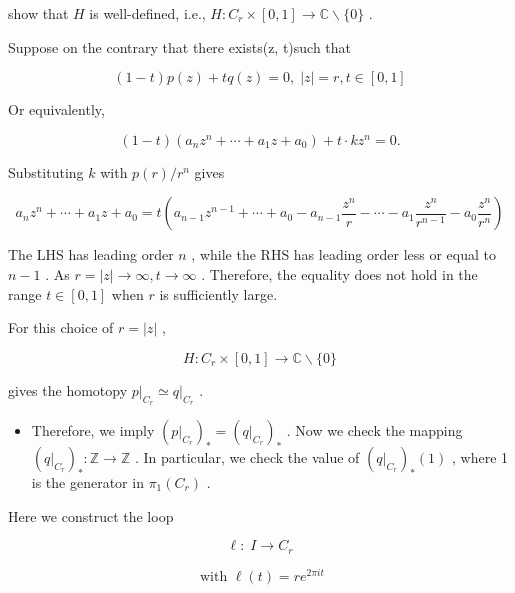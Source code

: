 show that \(H\) is well-defined, i.e., \(H : {C}_{r} \times  \left\lbrack  {0,1}\right\rbrack   \rightarrow  \mathbb{C} \smallsetminus  \{ 0\}\) .

Suppose on the contrary that there exists(z, t)such that

\[
\left( {1 - t}\right) p\left( z\right)  + {tq}\left( z\right)  = 0,\;\left| z\right|  = r,t \in  \left\lbrack  {0,1}\right\rbrack
\]

Or equivalently,

\[
\left( {1 - t}\right) \left( {{a}_{n}{z}^{n} + \cdots  + {a}_{1}z + {a}_{0}}\right)  + t \cdot  k{z}^{n} = 0.
\]

Substituting \(k\) with \(p\left( r\right) /{r}^{n}\) gives

\[
{a}_{n}{z}^{n} + \cdots  + {a}_{1}z + {a}_{0} = t\left( {{a}_{n - 1}{z}^{n - 1} + \cdots  + {a}_{0} - {a}_{n - 1}\frac{{z}^{n}}{r} - \cdots  - {a}_{1}\frac{{z}^{n}}{{r}^{n - 1}} - {a}_{0}\frac{{z}^{n}}{{r}^{n}}}\right)
\]

The LHS has leading order \(n\) , while the RHS has leading order less or equal to \(n - 1\) . As \(r = \left| z\right|  \rightarrow  \infty ,t \rightarrow  \infty\) . Therefore, the equality does not hold in the range \(t \in  \left\lbrack  {0,1}\right\rbrack\) when \(r\) is sufficiently large.

For this choice of \(r = \left| z\right|\) ,

\[
H : {C}_{r} \times  \left\lbrack  {0,1}\right\rbrack   \rightarrow  \mathbb{C} \smallsetminus  \{ 0\}
\]

gives the homotopy \({\left. p\right| }_{{C}_{r}} \simeq  {\left. q\right| }_{{C}_{r}}\) .

\begin{itemize}
\item Therefore, we imply \({\left( {\left. p\right| }_{{C}_{r}}\right) }_{ * } = {\left( {\left. q\right| }_{{C}_{r}}\right) }_{ * }\) . Now we check the mapping \({\left( {\left. q\right| }_{{C}_{r}}\right) }_{ * } : \mathbb{Z} \rightarrow  \mathbb{Z}\) . In particular, we check the value of \({\left( {\left. q\right| }_{{C}_{r}}\right) }_{ * }\left( 1\right)\) , where 1 is the generator in \({\pi }_{1}\left( {C}_{r}\right)\) .
\end{itemize}

Here we construct the loop

\[
\ell  : \;I \rightarrow  {C}_{r}
\]

\[
\text{ with }\ell \left( t\right)  = r{e}^{2\pi it}
\]

